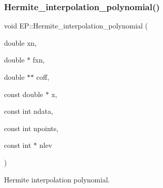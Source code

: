 \subsubsection{\texorpdfstring{Hermite\+\_\+interpolation\+\_\+polynomial()}{Hermite\_interpolation\_polynomial()}}
{\footnotesize\ttfamily void E\+P\+::\+Hermite\+\_\+interpolation\+\_\+polynomial (\begin{DoxyParamCaption}\item[{double}]{xn,  }\item[{double $\ast$}]{fxn,  }\item[{double $\ast$$\ast$}]{coff,  }\item[{const double $\ast$}]{x,  }\item[{const int}]{ndata,  }\item[{const int}]{npoints,  }\item[{const int $\ast$}]{nlev }\end{DoxyParamCaption})}



Hermite interpolation polynomial. 

